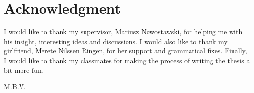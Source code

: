 \chapter*{Acknowledgment}
I would like to thank my supervisor, Mariusz Nowostawski, for helping me with his insight, interesting ideas and discussions.
I would also like to thank my girlfriend, Merete Nilssen Ringen, for her support and grammatical fixes.
Finally, I would like to thank my classmates for making the process of writing the thesis a bit more fun.

%
%

\begin{flushright}
M.B.V.\\[1pc]
\end{flushright}

